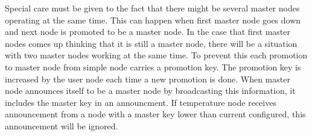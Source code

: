 Special care must be given to the fact that there might be several master nodes operating at the same time. This can happen when first master node goes down and next node is promoted to be a master node. In the case that first master nodes comes up thinking that it is still a master node, there will be a situation with two master nodes working at the same time. To prevent this each promotion to master node from simple node carries a promotion key. The promotion key is increased by the user node each time a new promotion is done. When master node announces itself to be a master node by broadcasting this information, it includes the master key in an announcment. If temperature node receives announcement from a node with a master key lower than current configured, this announcement will be ignored.

